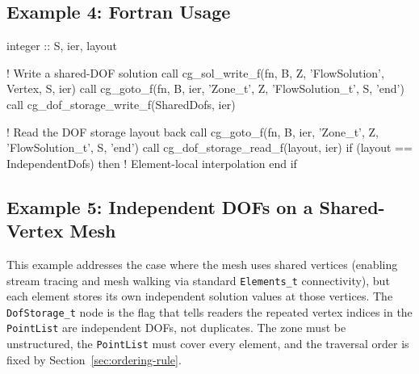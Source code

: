 \documentclass[11pt,letterpaper]{article}
\makeatletter
\let\cgns@orig@lstlisting\lstlisting
\let\cgns@endorig@lstlisting\endlstlisting
\renewenvironment{lstlisting}
  {\par\needspace{5\baselineskip}\nolinenumbers\cgns@orig@lstlisting}
  {\cgns@endorig@lstlisting\par\linenumbers}
\makeatother
\begin{document}
\subsection{Example 4: Fortran Usage}
\label{ex:fortran}

\begin{lstlisting}[language=Fortran]
integer :: S, ier, layout

! Write a shared-DOF solution
call cg_sol_write_f(fn, B, Z, 'FlowSolution', Vertex, S, ier)
call cg_goto_f(fn, B, ier, 'Zone_t', Z, 'FlowSolution_t', S, 'end')
call cg_dof_storage_write_f(SharedDofs, ier)

! Read the DOF storage layout back
call cg_goto_f(fn, B, ier, 'Zone_t', Z, 'FlowSolution_t', S, 'end')
call cg_dof_storage_read_f(layout, ier)
if (layout == IndependentDofs) then
    ! Element-local interpolation
end if
\end{lstlisting}

\subsection{Example 5: Independent DOFs on a Shared-Vertex Mesh}
\label{ex:shared-vertex-dg}

This example addresses the case where the mesh uses shared vertices
(enabling stream tracing and mesh walking via standard
\texttt{Elements\_t} connectivity), but each element stores its own
independent solution values at those vertices.  The
\texttt{DofStorage\_t} node is the flag that tells readers
the repeated vertex indices in the \texttt{PointList} are independent
DOFs, not duplicates.  The zone must be unstructured, the
\texttt{PointList} must cover every element, and the traversal order is
fixed by Section~\ref{sec:ordering-rule}.
\end{document}
